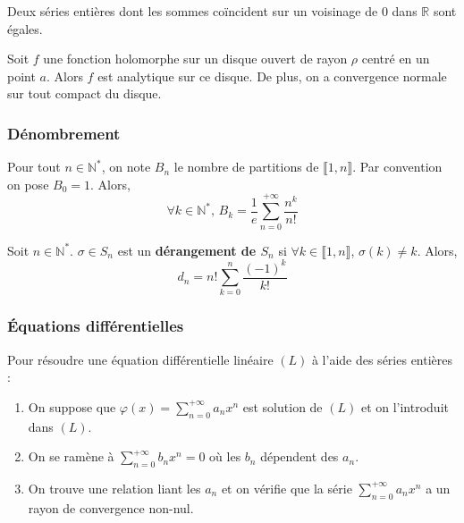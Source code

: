   \begin{corollary}
    Deux séries entières dont les sommes coïncident sur un voisinage de $0$ dans $\mathbb{R}$ sont égales.
  \end{corollary}


  \begin{theorem}
    Soit $f$ une fonction holomorphe sur un disque ouvert de rayon $\rho$ centré en un point $a$. Alors $f$ est analytique sur ce disque.
    De plus, on a convergence normale sur tout compact du disque.
  \end{theorem}

  \subsubsection{Dénombrement}


  \begin{application}
    Pour tout $n \in \mathbb{N}^*$, on note $B_n$ le nombre de partitions de $\llbracket 1, n \rrbracket$. Par convention on pose $B_0 = 1$. Alors,
    \[ \forall k \in \mathbb{N}^*, \, B_k = \frac{1}{e} \sum_{n=0}^{+\infty} \frac{n^k}{n!} \]
  \end{application}


  \begin{application}
    Soit $n \in \mathbb{N}^*$. $\sigma \in S_n$ est un \textbf{dérangement de $S_n$} si $\forall k \in \llbracket 1, n \rrbracket$, $\sigma(k) \neq k$.
    Alors,
    \[ d_n = n! \sum_{k=0}^n \frac{(-1)^k}{k!} \]
  \end{application}

  \subsubsection{Équations différentielles}


  \begin{proposition}
    Pour résoudre une équation différentielle linéaire $(L)$ à l'aide des séries entières :
    \begin{enumerate}[label={\bfseries(\roman*)}]
      \item On suppose que $\varphi(x) = \sum_{n=0}^{+\infty} a_n x^n$ est solution de $(L)$ et on l'introduit dans $(L)$.
      \item On se ramène à $\sum_{n=0}^{+\infty} b_nx^n = 0$ où les $b_n$ dépendent des $a_n$.
      \item On trouve une relation liant les $a_n$ et on vérifie que la série $\sum_{n=0}^{+\infty} a_n x^n$ a un rayon de convergence non-nul.
    \end{enumerate}
  \end{proposition}

